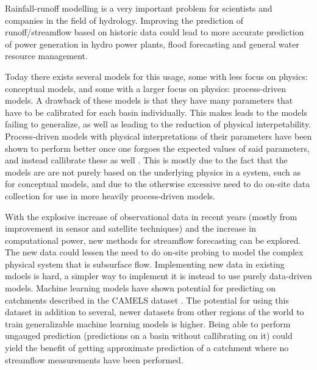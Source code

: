 Rainfall-runoff modelling is a very important problem for scientists and 
companies in the field of hydrology. Improving the prediction of runoff/streamflow 
based on historic data could lead to more accurate prediction of power generation 
in hydro power plants, flood forecasting and general water resource management.

Today there exists several models for this usage, some with less focus on physics: 
conceptual models, and some with a larger focus on physics: process-driven models. \citationneeded
A drawback of these models is that they have many parameters that have to be 
calibrated for each basin individually. 
This makes leads to the models failing to generalize, as well as leading to the 
reduction of physical interpetability. Process-driven models with physical interpretations 
of their parameters have been shown to perform better once one forgoes the expected 
values of said parameters, and instead callibrate these as well \citep[e.g.][]{VICbench, BiasVarianceVIC}.
This is mostly due to the fact that the models are are not purely based on the 
underlying physics in a system, such as for conceptual models, and due to 
the otherwise excessive need to do on-site data collection for use in more heavily 
process-driven models. 

With the explosive increase of observational data in recent years (mostly from 
improvement in sensor and satellite techniques) and the increase in computational 
power, new methods for streamflow forecasting can be explored. The new data could 
lessen the need to do on-site probing to model the complex physical system that is 
subsurface flow. Implementing new data in existing mdoels is hard, a simpler 
way to implement it is instead to use purely data-driven models. Machine learning 
models have shown potential for predicting on catchments described in the CAMELS 
dataset \citep{lstm_first_paper, CAMELS_US}. The potential for using this dataset in addition to several, 
newer datasets from other regions of the world to train generalizable 
machine learning models is higher. Being able to perform ungauged prediction 
(predictions on a basin without callibrating on it) could yield the benefit of 
getting approximate prediction of a catchment where no streamflow measurements 
have been performed.


